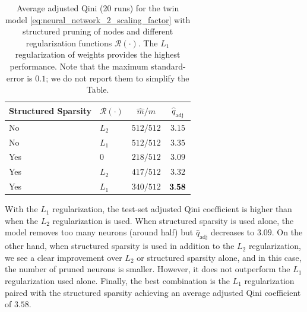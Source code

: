 \documentclass{article}
\def\qadj{\hat{q}_{\mathrm{adj}}}
\def\R{\mathcal R}
\def \vahid {\color{magenta}}
\begin{document}
\begin{table}[!ht]
    \centering
    \begin{tabular}{llcc}%
        \hline
        Structured Sparsity & $\R(\cdot)$ & $\hat{m}/m$ & $\qadj$ \\%
        \hline
        No & $L_2$ & $512/512$ & $3.15$ \\%
        No &$L_1$ &  $512/512$ & $3.35$ \\%
        Yes & 0 & $218/512$ & $3.09$ \\%
        Yes &$L_2$  & $417/512$ & $3.32$ \\%
        Yes &$L_1$  & $340/512$ & $\bf 3.58$ \\%
        \hline
    \end{tabular}
    \vspace{2mm}
    \caption{Average adjusted Qini (20 runs) for the twin model \eqref{eq:neural_network_2_scaling_factor} with structured pruning of nodes and different regularization functions $\R(\cdot)$. The $L_1$ regularization of weights provides the highest performance. Note that the maximum standard-error is $0.1$; we do not report them to simplify the Table. %
    }
    \label{tab:l1_l2_gl_}
\end{table}

With the $ L_1 $ regularization, the test-set adjusted Qini coefficient is higher than when the $ L_2 $ regularization is used. When structured sparsity is used alone, the model removes too many neurons (around half) but $\qadj$ decreases to $3.09$. On the other hand, when structured sparsity is used in addition to the $ L_2 $ regularization, we see a clear improvement over $L_2$ or structured sparsity alone, and in this case, the number of pruned neurons is smaller. However, it does not outperform the $L_1$ regularization used alone. Finally, the best combination is the $ L_1 $ regularization paired with the structured sparsity achieving an average adjusted Qini coefficient of $3.58$. 
\end{document}
